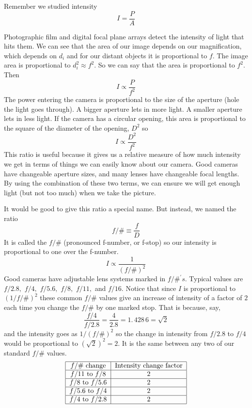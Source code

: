\documentclass{article}
\begin{document}
Remember we studied intensity%
\[
I=\frac{P}{A}
\]

Photographic film and digital focal plane arrays detect the intensity of
light that hits them. We can see that the area of our image depends on our
magnification, which depends on $d_{i}$ and for our distant objects it is
proportional to $f.$ The image area is proportional to $d_{i}^{2}\approx
f^{2}.$ So we can say that the area is proportional to $f^{2}.$ Then 
\[
I\propto \frac{P}{f^{2}}
\]%
The power entering the camera is proportional to the size of the aperture
(hole the light goes through). A bigger aperture lets in more light. A
smaller aperture lets in less light. If the camera has a circular opening,
this area is proportional to the square of the diameter of the opening, $%
D^{2}$ so%
\[
I\propto \frac{D^{2}}{f^{2}}
\]%
This ratio is useful because it gives us a relative measure of how much
intensity we get in terms of things we can easily know about our camera.
Good cameras have changeable aperture sizes, and many lenses have changeable
focal lengths. By using the combination of these two terms, we can ensure we
will get enough light (but not too much) when we take the picture.

It would be good to give this ratio a special name. But instead, we named
the ratio 
\begin{equation}
f/\#\equiv \frac{f}{D}
\end{equation}%
It is called the $f/\#$ (pronounced f-number, or f-stop) so our intensity is
proportional to one over the f-number. 
\begin{equation}
I\propto \frac{1}{\left( f/\#\right) ^{2}}
\end{equation}%
Good cameras have adjustable lens systems marked in $f/\#^{\prime }s$.
Typical values are $f/2.8,$ $f/4,$ $f/5.6,$ $f/8,$ $f/11,$ and $f/16.$
Notice that since $I$ is proportional to $\left( 1/f/\#\right) ^{2}$ these
common $f/\#$ values give an increase of intensity of a factor of $2$ each
time you change the $f/\#$ by one marked stop. That is because, say, 
\[
\frac{f/4}{f/2.8}=\frac{4}{2.8}=1.\,\allowbreak 428\,6\allowbreak =\sqrt{2}
\]
and the intensity goes as $1/\left( f/\#\right) ^{2}$ so the change in
intensity from $f/2.8$ to $f/4$ would be proportional to $\left( \sqrt{2}%
\right) ^{2}=2.$ It is the same between any two of our standard $f/\#$
values.%
\[
\begin{tabular}{|c|c|}
\hline
$f/\#$ change & Intensity change factor \\ \hline
$f/11$ to $f/8$ & $2$ \\ \hline
$f/8$ to $f/5.6$ & $2$ \\ \hline
$f/5.6$ to $f/4$ & $2$ \\ \hline
$f/4$ to $f/2.8$ & $2$ \\ \hline
\end{tabular}%
\]
\end{document}
